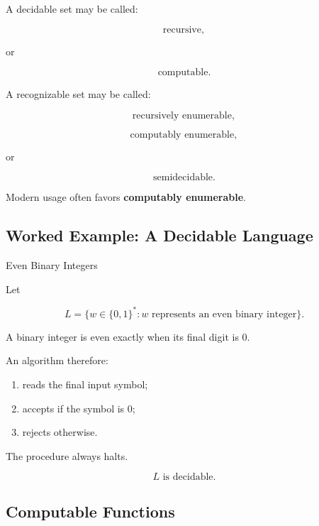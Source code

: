 A decidable set may be called:

\[
\boxed{
\text{recursive},
}
\]

or

\[
\boxed{
\text{computable}.
}
\]

A recognizable set may be called:

\[
\boxed{
\text{recursively enumerable},
}
\]

\[
\boxed{
\text{computably enumerable},
}
\]

or

\[
\boxed{
\text{semidecidable}.
}
\]

Modern usage often favors \textbf{computably enumerable}.

\subsection{Worked Example: A Decidable Language}
\label{subsec:worked-decidable-language}

\begin{workedexamplebox}{Even Binary Integers}

Let

\[
L
=
\{
w\in\{0,1\}^*:
w
\text{ represents an even binary integer}
\}.
\]

A binary integer is even exactly when its final digit is \(0\).

An algorithm therefore:

\begin{enumerate}
    \item reads the final input symbol;
    \item accepts if the symbol is \(0\);
    \item rejects otherwise.
\end{enumerate}

The procedure always halts.

\begin{answerbox}
\[
\boxed{
L
\text{ is decidable}.
}
\]
\end{answerbox}

\end{workedexamplebox}

\subsection{Computable Functions}
\label{subsec:computable-functions}

